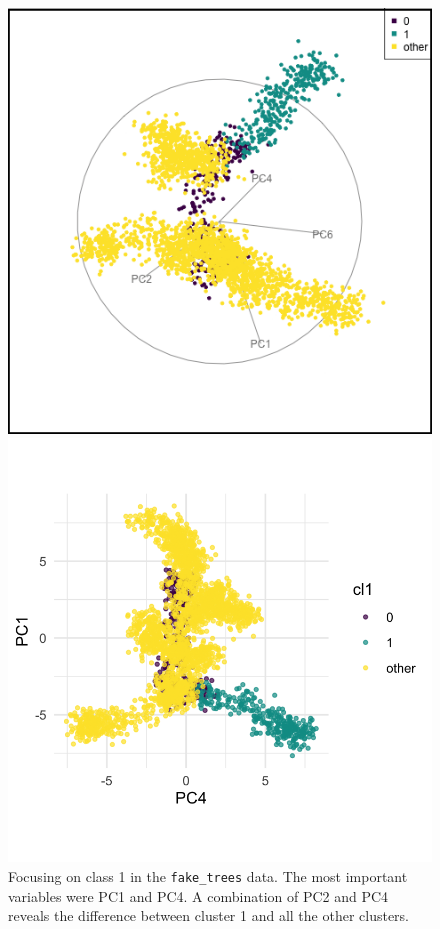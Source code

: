\documentclass[
  letterpaper,
]{krantz}
\begin{document}
\begin{figure}

\begin{minipage}{0.50\linewidth}
\includegraphics{images/ft_cl1.png}\end{minipage}%
%
\begin{minipage}{0.50\linewidth}
\includegraphics{images/fig-ft-cl1-pc-1.png}\end{minipage}%

\caption{\label{fig-ft-cl-pdf}Focusing on class 1 in the
\texttt{fake\_trees} data. The most important variables were PC1 and
PC4. A combination of PC2 and PC4 reveals the difference between cluster
1 and all the other clusters.}

\end{figure}%
\end{document}
